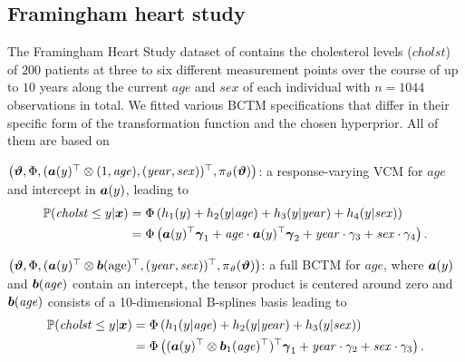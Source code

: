 \documentclass[12pt]{article}
\theoremstyle{plain}
\begin{document}
\subsection{Framingham heart study}\label{sec:fram}
The Framingham Heart Study dataset of  \citep{zhang2001linear} contains the cholesterol levels ($\mathit{cholst}$) of $200$ patients at three to six different measurement points over the course of up to $10$ years along the current $\mathit{age}$ and $\mathit{sex}$ of each individual with $n=1044$ observations in total. We fitted various BCTM specifications that differ in their specific form of the transformation function and the chosen hyperprior. All of them are based on
\begin{compactitem}
\item $\big( \text{\boldmath$\vartheta$},\Phi,\allowbreak (\text{\boldmath$a$}(y)^\top \otimes\allowbreak (1, \mathit{age}),\allowbreak (\mathit{year},\allowbreak \mathit{sex}) )^\top, \pi_\vartheta(\text{\boldmath$\vartheta$})\big)$: a response-varying VCM for $\mathit{age}$ and intercept in $\text{\boldmath$a$}(y)$, leading to %
\begin{align*}
\mathbb{P}(\mathit{cholst} \leq y | \text{\boldmath$x$}) &= \Phi \left( h_1(y) + h_2(y |\mathit{age})+ h_3(y |\mathit{year})+ h_4(y |\mathit{sex})\right)  \\
&= \Phi\left( \text{\boldmath$a$}(y)^\top \text{\boldmath$\gamma$}_1 + \mathit{age}\cdot\bm{a}(y)^\top \text{\boldmath$\gamma$}_2  + \mathit{year} \cdot\gamma_3 + \mathit{sex}\cdot \gamma_4  \right).
\end{align*}
\item $\big( \text{\boldmath$\vartheta$},\Phi, ( \text{\boldmath$a$}(y)^\top \otimes  \text{\boldmath$b$}(\mathrm{age})^\top, (\mathit{year}, \mathit{sex}))^\top,\allowbreak \pi_\vartheta(\text{\boldmath$\vartheta$})\big)$: a full BCTM for $\mathit{age}$, where $\text{\boldmath$a$}(y)$ and $\text{\boldmath$b$}(\mathit{age})$ contain an intercept, the tensor product is centered around zero and $\text{\boldmath$b$}(\mathit{age})$ consists of a 10-dimensional B-splines basis leading to 
\begin{align*}
\mathbb{P}(\mathit{cholst} \leq y | \text{\boldmath$x$}) &= \Phi \left(h_1(y |\mathit{age})+ h_2(y |\mathit{year})+ h_3(y |\mathit{sex})\right)  \\
&= \Phi\left( (\text{\boldmath$a$}(y)^\top \otimes \text{\boldmath$b$}_1(\mathit{age})^\top)^\top \text{\boldmath$\gamma$}_1 + \mathit{year} \cdot\gamma_2 + \mathit{sex}\cdot \gamma_3\right).
\end{align*}
\end{compactitem}
\end{document}
